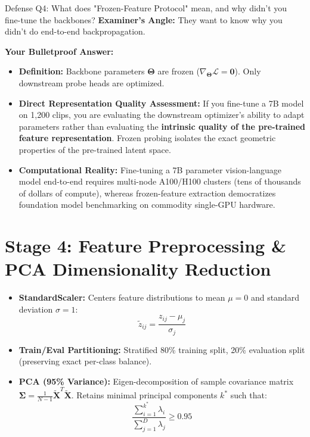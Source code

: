 \documentclass[a4paper, 11pt]{article}
\begin{document}
\begin{defensebox}{Defense Q4: What does "Frozen-Feature Protocol" mean, and why didn't you fine-tune the backbones?}
\textbf{Examiner's Angle:} They want to know why you didn't do end-to-end backpropagation.

\textbf{Your Bulletproof Answer:}
\begin{itemize}
    \item \textbf{Definition:} Backbone parameters $\mathbf{\Theta}$ are frozen ($\nabla_{\mathbf{\Theta}} \mathcal{L} = \mathbf{0}$). Only downstream probe heads are optimized.
    \item \textbf{Direct Representation Quality Assessment:} If you fine-tune a 7B model on 1,200 clips, you are evaluating the downstream optimizer's ability to adapt parameters rather than evaluating the \textbf{intrinsic quality of the pre-trained feature representation}. Frozen probing isolates the exact geometric properties of the pre-trained latent space.
    \item \textbf{Computational Reality:} Fine-tuning a 7B parameter vision-language model end-to-end requires multi-node A100/H100 clusters (tens of thousands of dollars of compute), whereas frozen-feature extraction democratizes foundation model benchmarking on commodity single-GPU hardware.
\end{itemize}
\end{defensebox}

\section{Stage 4: Feature Preprocessing \& PCA Dimensionality Reduction}

\begin{techbox}
\begin{itemize}
    \item \textbf{StandardScaler:} Centers feature distributions to mean $\mu=0$ and standard deviation $\sigma=1$:
    \[
    \tilde{z}_{ij} = \frac{z_{ij} - \mu_j}{\sigma_j}
    \]
    \item \textbf{Train/Eval Partitioning:} Stratified 80\% training split, 20\% evaluation split (preserving exact per-class balance).
    \item \textbf{PCA (95\% Variance):} Eigen-decomposition of sample covariance matrix $\mathbf{\Sigma} = \frac{1}{N-1}\tilde{\mathbf{X}}^T\tilde{\mathbf{X}}$. Retains minimal principal components $k^*$ such that:
    \[
    \frac{\sum_{i=1}^{k^*} \lambda_i}{\sum_{j=1}^D \lambda_j} \ge 0.95
    \]
\end{itemize}
\end{techbox}
\end{document}
